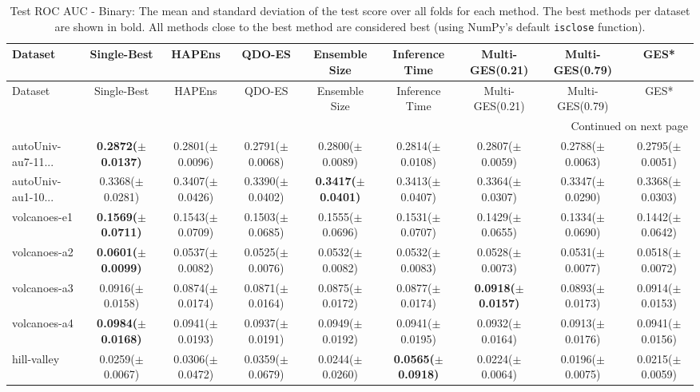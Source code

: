 \begin{longtable}{lcccccccc}
\caption{Test ROC AUC - Binary: The mean and standard deviation of the test score over all folds for each method. The best methods per dataset are shown in bold. All methods close to the best method are considered best (using NumPy’s default \texttt{isclose} function).}
\label{tab:results} \\ 
\toprule
Dataset & Single-Best & HAPEns & QDO-ES & Ensemble Size & Inference Time & Multi-GES(0.21) & Multi-GES(0.79) & GES* \\
\midrule
\endfirsthead
\toprule
Dataset & Single-Best & HAPEns & QDO-ES & Ensemble Size & Inference Time & Multi-GES(0.21) & Multi-GES(0.79) & GES* \\
\midrule
\endhead
\midrule
\multicolumn{9}{r}{Continued on next page} \\
\midrule
\endfoot
\bottomrule
\endlastfoot
autoUniv-au7-11... & \textbf{0.2872($\pm$0.0137)} & 0.2801($\pm$0.0096) & 0.2791($\pm$0.0068) & 0.2800($\pm$0.0089) & 0.2814($\pm$0.0108) & 0.2807($\pm$0.0059) & 0.2788($\pm$0.0063) & 0.2795($\pm$0.0051) \\
autoUniv-au1-10... & 0.3368($\pm$0.0281) & 0.3407($\pm$0.0426) & 0.3390($\pm$0.0402) & \textbf{0.3417($\pm$0.0401)} & 0.3413($\pm$0.0407) & 0.3364($\pm$0.0307) & 0.3347($\pm$0.0290) & 0.3368($\pm$0.0303) \\
volcanoes-e1 & \textbf{0.1569($\pm$0.0711)} & 0.1543($\pm$0.0709) & 0.1503($\pm$0.0685) & 0.1555($\pm$0.0696) & 0.1531($\pm$0.0707) & 0.1429($\pm$0.0655) & 0.1334($\pm$0.0690) & 0.1442($\pm$0.0642) \\
volcanoes-a2 & \textbf{0.0601($\pm$0.0099)} & 0.0537($\pm$0.0082) & 0.0525($\pm$0.0076) & 0.0532($\pm$0.0082) & 0.0532($\pm$0.0083) & 0.0528($\pm$0.0073) & 0.0531($\pm$0.0077) & 0.0518($\pm$0.0072) \\
volcanoes-a3 & 0.0916($\pm$0.0158) & 0.0874($\pm$0.0174) & 0.0871($\pm$0.0164) & 0.0875($\pm$0.0172) & 0.0877($\pm$0.0174) & \textbf{0.0918($\pm$0.0157)} & 0.0893($\pm$0.0173) & 0.0914($\pm$0.0153) \\
volcanoes-a4 & \textbf{0.0984($\pm$0.0168)} & 0.0941($\pm$0.0193) & 0.0937($\pm$0.0191) & 0.0949($\pm$0.0192) & 0.0941($\pm$0.0195) & 0.0932($\pm$0.0164) & 0.0913($\pm$0.0176) & 0.0941($\pm$0.0156) \\
hill-valley & 0.0259($\pm$0.0067) & 0.0306($\pm$0.0472) & 0.0359($\pm$0.0679) & 0.0244($\pm$0.0260) & \textbf{0.0565($\pm$0.0918)} & 0.0224($\pm$0.0064) & 0.0196($\pm$0.0075) & 0.0215($\pm$0.0059) \\

\end{longtable}
